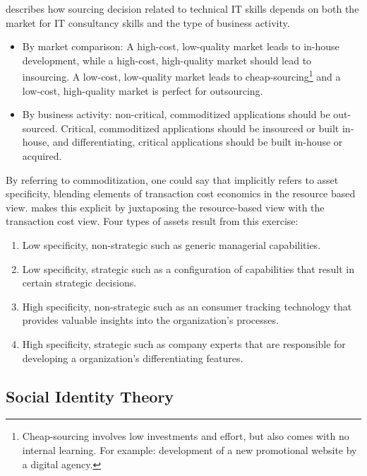 \documentclass[12pt]{article}
\providecommand{\tightlist}{%
  \setlength{\itemsep}{0pt}\setlength{\parskip}{0pt}}
\begin{document}
\citet[188-189]{willcocks2003} describes how sourcing decision related
to technical IT skills depends on both the market for IT consultancy
skills and the type of business activity.

\begin{itemize}
\tightlist
\item
  By market comparison: A high-cost, low-quality market leads to
  in-house development, while a high-cost, high-quality market should
  lead to insourcing. A low-cost, low-quality market leads to
  cheap-sourcing\footnote{Cheap-sourcing involves low investments and
    effort, but also comes with no internal learning. For example:
    development of a new promotional website by a digital agency.} and a
  low-cost, high-quality market is perfect for outsourcing.
\item
  By business activity: non-critical, commoditized applications should
  be out-sourced. Critical, commoditized applications should be
  insourced or built in-house, and differentiating, critical
  applications should be built in-house or acquired.
\end{itemize}

By referring to commoditization, one could say that
\citet{willcocks2003} implicitly refers to asset specificity, blending
elements of transaction cost economics in the resource based view.
\citet[405-407]{watjatrakul2005} makes this explicit by juxtaposing the
resource-based view with the transaction cost view. Four types of assets
result from this exercise:

\begin{enumerate}
\def\labelenumi{\arabic{enumi}.}
\tightlist
\item
  Low specificity, non-strategic such as generic managerial
  capabilities.
\item
  Low specificity, strategic such as a configuration of capabilities
  that result in certain strategic decisions.
\item
  High specificity, non-strategic such as an consumer tracking
  technology that provides valuable insights into the organization's
  processes.
\item
  High specificity, strategic such as company experts that are
  responsible for developing a organization's differentiating features.
\end{enumerate}

\subsection{Social Identity Theory}\label{social-identity-theory}
\end{document}
